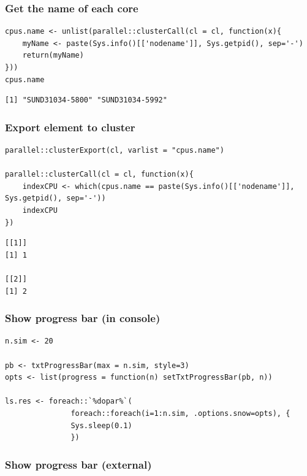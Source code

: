 \documentclass{article}
\begin{document}
\subsubsection{Get the name of each core}
\label{sec:org4b1194c}

\lstset{language=r,label= ,caption= ,captionpos=b,numbers=none}
\begin{lstlisting}
cpus.name <- unlist(parallel::clusterCall(cl = cl, function(x){
    myName <- paste(Sys.info()[['nodename']], Sys.getpid(), sep='-')
    return(myName)
}))
cpus.name
\end{lstlisting}

\begin{verbatim}
[1] "SUND31034-5800" "SUND31034-5992"
\end{verbatim}

\subsubsection{Export element to cluster}
\label{sec:org0b7b794}
\lstset{language=r,label= ,caption= ,captionpos=b,numbers=none}
\begin{lstlisting}
parallel::clusterExport(cl, varlist = "cpus.name")

parallel::clusterCall(cl = cl, function(x){
    indexCPU <- which(cpus.name == paste(Sys.info()[['nodename']], Sys.getpid(), sep='-'))
    indexCPU
})
\end{lstlisting}

\begin{verbatim}
[[1]]
[1] 1

[[2]]
[1] 2
\end{verbatim}

\subsubsection{Show progress bar (in console)}
\label{sec:org418d9da}

\lstset{language=r,label= ,caption= ,captionpos=b,numbers=none}
\begin{lstlisting}
n.sim <- 20

pb <- txtProgressBar(max = n.sim, style=3)
opts <- list(progress = function(n) setTxtProgressBar(pb, n))

ls.res <- foreach::`%dopar%`(
		       foreach::foreach(i=1:n.sim, .options.snow=opts), {
			   Sys.sleep(0.1)
		       })
\end{lstlisting}

\subsubsection{Show progress bar (external)}
\label{sec:org2d97a67}
\end{document}
